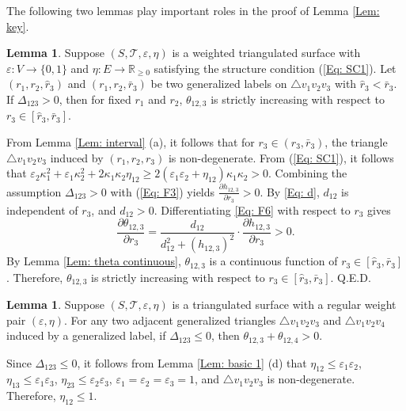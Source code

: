 \documentclass[12pt]{amsart}
\theoremstyle{definition}
\newtheorem{lemma}[theorem]{Lemma}
\def\qed{\hfill{Q.E.D.}\smallskip}
\begin{document}
The following two lemmas play important roles in the proof of Lemma \ref{Lem: key}.

\begin{lemma}\label{Lem: monotonicity}
Suppose $(S,\mathcal{T},\varepsilon,\eta)$ is a weighted triangulated surface with $\varepsilon: V\rightarrow \{0,1\}$ and $\eta: E\rightarrow \mathbb{R}_{\geq 0}$ satisfying the structure condition (\ref{Eq: SC1}).
Let $(r_1, r_2, \hat{r}_3)$ and $(r_1, r_2, \bar{r}_3)$ be two generalized labels on $\triangle v_1v_2v_3$ with $\hat{r}_3<\bar{r}_3$.
If $\Delta_{123}>0$, then for fixed $r_1$ and $r_2$, $\theta_{12,3}$ is strictly increasing with respect to $r_3\in [\hat{r}_3,\bar{r}_3]$.
\end{lemma}
\proof
From Lemma \ref{Lem: interval} (a), it follows that for $r_3\in (\hat{r}_3,\bar{r}_3)$, the triangle $\triangle v_1v_2v_3$ induced by $(r_1, r_2, r_3)$ is non-degenerate. 
From (\ref{Eq: SC1}), it follows that $\varepsilon_2\kappa_1^2+\varepsilon_1\kappa_2^2 +2\kappa_1\kappa_2\eta_{12} \geq 2(\varepsilon_1\varepsilon_2+\eta_{12})\kappa_1\kappa_2 >0$. 
Combining the assumption $\Delta_{123}>0$ with (\ref{Eq: F3}) yields $\frac{\partial{h_{12,3}}}{\partial{r_3}}>0$. 
By \eqref{Eq: d}, $d_{12}$ is independent of $r_3$, and $d_{12}>0$. 
Differentiating \eqref{Eq: F6} with respect to $r_3$ gives
\begin{equation*}
\frac{\partial{\theta_{12,3}}}{\partial r_3}
=\frac{d_{12}}{d_{12}^2+(h_{12,3})^2}
\cdot\frac{\partial{h_{12,3}}}{\partial{r_3}}>0.
\end{equation*}
By Lemma \ref{Lem: theta continuous}, $\theta_{12,3}$ is a continuous function of $r_3\in [\hat{r}_3,\bar{r}_3]$. 
Therefore, $\theta_{12,3}$ is strictly increasing with respect to $r_3\in [\hat{r}_3,\bar{r}_3]$.
\qed

\begin{lemma}\label{Lem: key2}
Suppose $(S,\mathcal{T},\varepsilon,\eta)$ is a triangulated surface with a regular weight pair $(\varepsilon,\eta)$.
For any two adjacent generalized triangles $\triangle v_1v_2v_3$ and $\triangle v_1v_2v_4$ induced by a generalized label,
if $\Delta_{123}\leq 0$,
then $\theta_{12,3}+\theta_{12,4}>0$.
\end{lemma}
\proof
Since $\Delta_{123}\leq 0$, it follows from Lemma \ref{Lem: basic 1} (d) that $\eta_{12}\leq\varepsilon_1\varepsilon_2$, $\eta_{13}\leq\varepsilon_1\varepsilon_3$, $\eta_{23}\leq\varepsilon_2\varepsilon_3$, $\varepsilon_1=\varepsilon_2=\varepsilon_3=1$, and $\triangle v_1v_2v_3$ is non-degenerate. 
Therefore, $\eta_{12}\leq 1$. 
\end{document}
